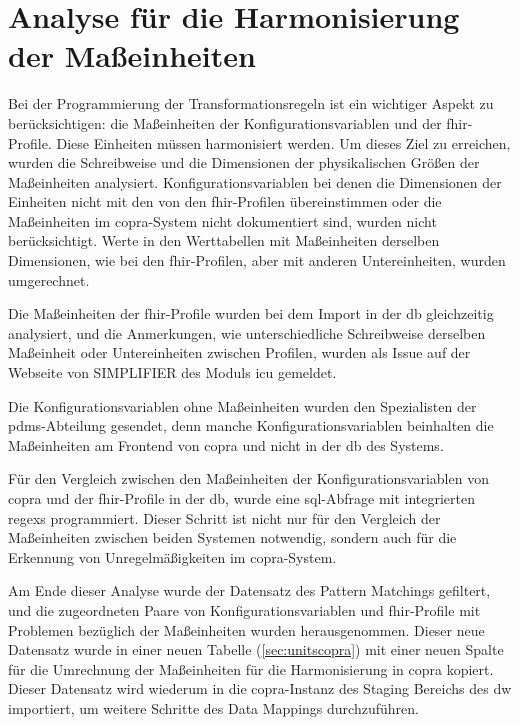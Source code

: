 \section{Analyse für die Harmonisierung der Maßeinheiten} \label{sec:units}

Bei der Programmierung der Transformationsregeln ist ein wichtiger Aspekt zu berücksichtigen: die Maßeinheiten der Konfigurationsvariablen und der \ac{fhir}-Profile. Diese Einheiten müssen harmonisiert werden. Um dieses Ziel zu erreichen, wurden die Schreibweise und die Dimensionen der physikalischen Größen der Maßeinheiten analysiert. Konfigurationsvariablen bei denen die Dimensionen der Einheiten nicht mit den von den \ac{fhir}-Profilen übereinstimmen oder die Maßeinheiten im \ac{copra}-System nicht dokumentiert sind, wurden nicht berücksichtigt. Werte in den Werttabellen mit Maßeinheiten derselben Dimensionen, wie bei den \ac{fhir}-Profilen, aber mit anderen Untereinheiten, wurden umgerechnet.

Die Maßeinheiten der \ac{fhir}-Profile wurden bei dem Import in der \ac{db} gleichzeitig analysiert, und die Anmerkungen, wie unterschiedliche Schreibweise derselben Maßeinheit oder Untereinheiten zwischen Profilen, wurden als Issue auf der Webseite von SIMPLIFIER des Moduls \glqq\ac{icu}\grqq{} gemeldet.

Die Konfigurationsvariablen ohne Maßeinheiten wurden den Spezialisten der \ac{pdms}-Abteilung gesendet, denn manche Konfigurationsvariablen beinhalten die Maßeinheiten am Frontend von \ac{copra} und nicht in der \ac{db} des Systems.

Für den Vergleich zwischen den Maßeinheiten der Konfigurationsvariablen von \ac{copra} und der \ac{fhir}-Profile in der \ac{db}, wurde eine \ac{sql}-Abfrage mit integrierten \acp{regex} programmiert. Dieser Schritt ist nicht nur für den Vergleich der Maßeinheiten zwischen beiden Systemen notwendig, sondern auch für die Erkennung von Unregelmäßigkeiten im \ac{copra}-System.

Am Ende dieser Analyse wurde der Datensatz des Pattern Matchings gefiltert, und die zugeordneten Paare von Konfigurationsvariablen und \ac{fhir}-Profile mit Problemen bezüglich der Maßeinheiten wurden herausgenommen. Dieser neue Datensatz wurde in einer neuen Tabelle (\ref{sec:unitscopra}) mit einer neuen Spalte für die Umrechnung der Maßeinheiten für die Harmonisierung in \ac{copra} kopiert. Dieser Datensatz wird wiederum in die \ac{copra}-Instanz des Staging Bereichs des \ac{dw} importiert, um weitere Schritte des Data Mappings durchzuführen.